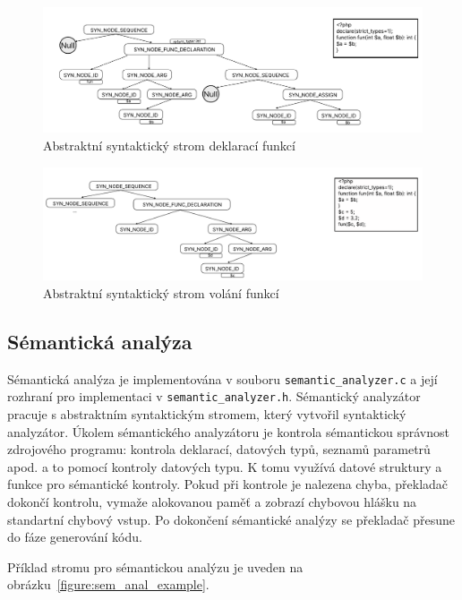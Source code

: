 \documentclass[a4paper, 11pt]{article}
\begin{document}
    \begin{figure}[!ht]
		\centering
		\includegraphics[width=1\linewidth]{func_dec.pdf}
		\caption{Abstraktní syntaktický strom deklarací funkcí}
		\label{figure:ast_example}
	\end{figure}

    \begin{figure}[!ht]
		\centering
		\includegraphics[width=1\linewidth]{func_call.pdf}
		\caption{Abstraktní syntaktický strom volání funkcí}
		\label{figure:ast_example}
	\end{figure}
    \newpage

	\subsection{Sémantická analýza}
	Sémantická analýza je implementována v souboru \texttt{semantic\_analyzer.c} a její rozhraní pro implementaci
	v \texttt{semantic\_analyzer.h}. Sémantický analyzátor pracuje s abstraktním syntaktickým stromem, který
	vytvořil syntaktický analyzátor. Úkolem sémantického analyzátoru je kontrola sémantickou správnost zdrojového
	programu: kontrola deklarací, datových typů, seznamů parametrů apod. a to pomocí kontroly datových typu. K
	tomu využívá datové struktury a funkce pro sémantické kontroly. Pokud při kontrole je nalezena chyba, překladač dokončí
	kontrolu, vymaže alokovanou paměť a zobrazí chybovou hlášku na standartní chybový vstup. Po dokončení
	sémantické analýzy se překladač přesune do fáze generování kódu.

	Příklad stromu pro sémantickou analýzu je uveden na obrázku~\ref{figure:sem_anal_example}.
\end{document}
